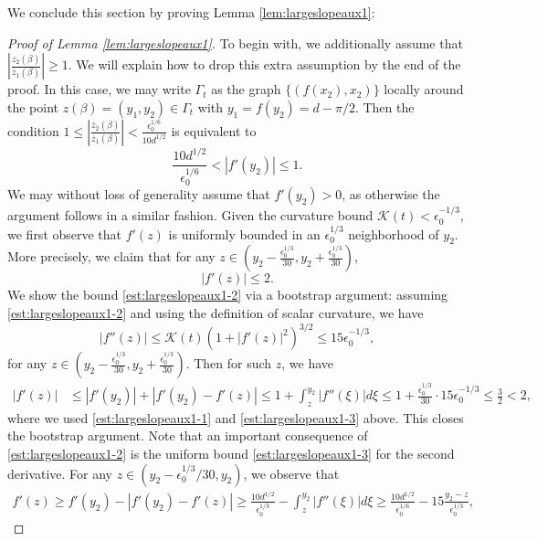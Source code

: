 \documentclass[11pt]{article}
\numberwithin{equation}{section}
\newcommand{\eps}{\epsilon}
\newcommand{\calK}{\mathcal{K}}
\begin{document}
We conclude this section by proving Lemma \ref{lem:largeslopeaux1}:
\begin{proof}[Proof of Lemma \ref{lem:largeslopeaux1}]
    To begin with, we additionally assume that $\left|\frac{\dot{z_2}(\beta)}{\dot{z_1}(\beta)}\right| \ge 1$. We will explain how to drop this extra assumption by the end of the proof. In this case, we may write $\Gamma_t$ as the graph $\{(f(x_2), x_2)\}$ locally around the point $z(\beta) = (y_1, y_2) \in \Gamma_t$ with $y_1 = f(y_2) = d -\pi/2$. Then the condition $1 \le \left|\frac{\dot{z_2}(\beta)}{\dot{z_1}(\beta)}\right| < \frac{\eps_0^{1/6}}{10d^{1/2}}$ is equivalent to
    \begin{equation}
        \label{est:largeslopeaux1-1}
        \frac{10d^{1/2}}{\eps_0^{1/6}} < |f'(y_2)| \le 1.
    \end{equation}
    We may without loss of generality assume that $f'(y_2) > 0$, as otherwise the argument follows in a similar fashion. Given the curvature bound $\calK(t) < \eps_0^{-1/3}$, we first observe that $f'(z)$ is uniformly bounded in an $\eps_0^{1/3}$ neighborhood of $y_2$. More precisely, we claim that for any $z \in (y_2 - \frac{\eps_0^{1/3}}{30}, y_2 + \frac{\eps_0^{1/3}}{30})$, 
    \begin{equation}\label{est:largeslopeaux1-2}
    |f'(z)| \le 2.
    \end{equation}
    We show the bound \eqref{est:largeslopeaux1-2} via a bootstrap argument: assuming \eqref{est:largeslopeaux1-2} and using the definition of scalar curvature, we have
    \begin{equation}\label{est:largeslopeaux1-3}
    |f''(z)| \le \calK(t)(1 + |f'(z)|^2)^{3/2} \le 15\eps_0^{-1/3},
    \end{equation}
    for any $z \in \left(y_2 - \frac{\eps_0^{1/3}}{30}, y_2 + \frac{\eps_0^{1/3}}{30}\right)$. Then for such $z$, we have
    \begin{align*}
        |f'(z)| &\le |f'(y_2)| + |f'(y_2) - f'(z)| \le 1 + \int_z^{y_2} |f''(\xi)|d\xi \le 1 + \frac{\eps_0^{1/3}}{30}\cdot 15\eps_0^{-1/3} \le \frac{3}{2} < 2,
    \end{align*}
    where we used \eqref{est:largeslopeaux1-1} and \eqref{est:largeslopeaux1-3} above. This closes the bootstrap argument. Note that an important consequence of \eqref{est:largeslopeaux1-2} is the uniform bound \eqref{est:largeslopeaux1-3} for the second derivative. For any $z \in (y_2 - \eps_0^{1/3}/30, y_2)$, we observe that
    \begin{align*}
        f'(z) \ge f'(y_2) - |f'(y_2) - f'(z)| \ge \frac{10d^{1/2}}{\eps_0^{1/3}} - \int_z^{y_2} |f''(\xi)| d\xi \ge \frac{10d^{1/2}}{\eps_0^{1/6}} -15\frac{y_2 - z}{\eps_0^{1/3}},

\end{align*}
\end{proof}
\end{document}
